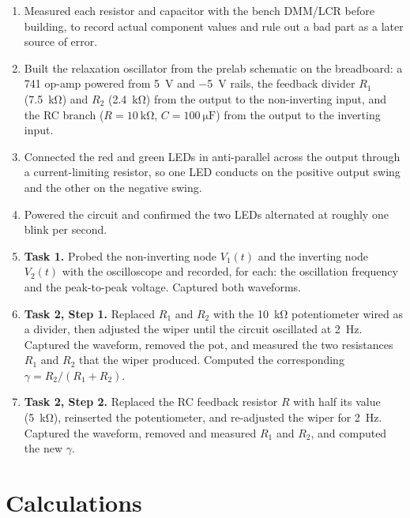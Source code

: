 \documentclass[11pt]{article}
\begin{document}
\begin{enumerate}
    \item Measured each resistor and capacitor with the bench DMM/LCR before
          building, to record actual component values and rule out a bad part as
          a later source of error.
    \item Built the relaxation oscillator from the prelab schematic on the
          breadboard: a \SI{741}{} op-amp powered from \SI{+5}{\volt} and
          \SI{-5}{\volt} rails, the feedback divider $R_1$ (\SI{7.5}{\kilo\ohm})
          and $R_2$ (\SI{2.4}{\kilo\ohm}) from the output to the non-inverting
          input, and the RC branch ($R = \SI{10}{\kilo\ohm}$, $C =
          \SI{100}{\micro\farad}$) from the output to the inverting input.
    \item Connected the red and green LEDs in anti-parallel across the output
          through a current-limiting resistor, so one LED conducts on the positive
          output swing and the other on the negative swing.
    \item Powered the circuit and confirmed the two LEDs alternated at roughly one
          blink per second.
    \item \textbf{Task 1.} Probed the non-inverting node $V_1(t)$ and the
          inverting node $V_2(t)$ with the oscilloscope and recorded, for each: the
          oscillation frequency and the peak-to-peak voltage. Captured both
          waveforms.
    \item \textbf{Task 2, Step 1.} Replaced $R_1$ and $R_2$ with the
          \SI{10}{\kilo\ohm} potentiometer wired as a divider, then adjusted the
          wiper until the circuit oscillated at \SI{2}{\hertz}. Captured the
          waveform, removed the pot, and measured the two resistances $R_1$ and
          $R_2$ that the wiper produced. Computed the corresponding
          $\gamma = R_2/(R_1+R_2)$.
    \item \textbf{Task 2, Step 2.} Replaced the RC feedback resistor $R$ with half
          its value (\SI{5}{\kilo\ohm}), reinserted the potentiometer, and
          re-adjusted the wiper for \SI{2}{\hertz}. Captured the waveform, removed
          and measured $R_1$ and $R_2$, and computed the new $\gamma$.
\end{enumerate}

\section*{Calculations}
\end{document}
